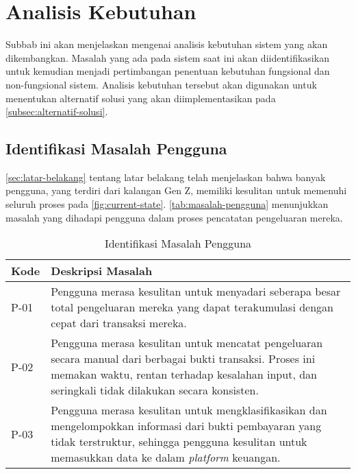 \section{Analisis Kebutuhan}
\label{sec:analisis-kebutuhan}

Subbab ini akan menjelaskan mengenai analisis kebutuhan sistem yang akan dikembangkan. Masalah yang ada pada sistem saat ini akan diidentifikasikan untuk kemudian menjadi pertimbangan penentuan kebutuhan fungsional dan non-fungsional sistem. Analisis kebutuhan tersebut akan digunakan untuk menentukan alternatif solusi yang akan diimplementasikan pada \autoref{subsec:alternatif-solusi}.

\subsection{Identifikasi Masalah Pengguna}
\label{subsec:identifikasi-masalah-pengguna}
\autoref{sec:latar-belakang} tentang latar belakang telah menjelaskan bahwa banyak pengguna, yang terdiri dari kalangan Gen Z, memiliki kesulitan untuk memenuhi seluruh proses pada \autoref{fig:current-state}. \autoref{tab:masalah-pengguna} menunjukkan masalah yang dihadapi pengguna dalam proses pencatatan pengeluaran mereka.

\begin{table}[h!]
\caption{Identifikasi Masalah Pengguna}
\label{tab:masalah-pengguna}
\begin{tabularx}{\linewidth}{|l|X|}
\hline
\textbf{Kode} & \textbf{Deskripsi Masalah} \\
\hline
P-01 & Pengguna merasa kesulitan untuk menyadari seberapa besar total pengeluaran mereka yang dapat terakumulasi dengan cepat dari transaksi mereka. \\
\hline
P-02 & Pengguna merasa kesulitan untuk mencatat pengeluaran secara manual dari berbagai bukti transaksi. Proses ini memakan waktu, rentan terhadap kesalahan input, dan seringkali tidak dilakukan secara konsisten. \\
\hline
P-03 & Pengguna merasa kesulitan untuk mengklasifikasikan dan mengelompokkan informasi dari bukti pembayaran yang tidak terstruktur, sehingga pengguna kesulitan untuk memasukkan data ke dalam \emph{platform} keuangan. \\
\hline
\end{tabularx}
\end{table}

